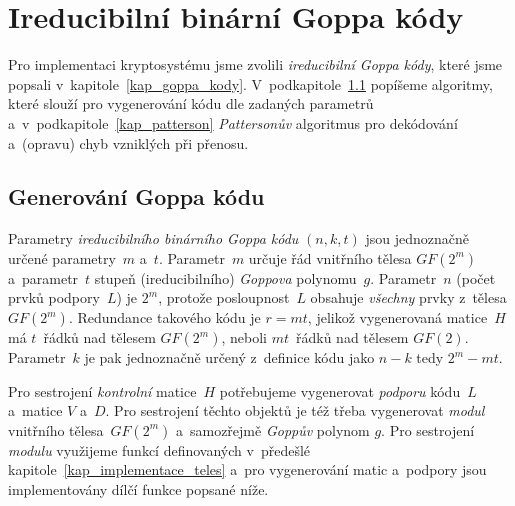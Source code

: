 \documentclass[thesis=M,czech,hidelinks]{FITthesis}[2012/06/26]
\newcommand{\0}{{\textcolor[gray]{0.75}{0}}}
\begin{document}
\clearpage

\section{Ireducibilní binární Goppa kódy}

Pro implementaci kryptosystému jsme zvolili \emph{ireducibilní Goppa kódy},
které jsme popsali v~kapitole~\ref{kap_goppa_kody}.
V~podkapitole~\ref{kap_generovani} popíšeme algoritmy, které slouží pro
vygenerování kódu dle zadaných parametrů a~v~podkapitole~\ref{kap_patterson}
\emph{Pattersonův} algoritmus pro dekódování a~(opravu) chyb vzniklých při
přenosu.


\subsection{Generování Goppa kódu}\label{kap_generovani}

Parametry \emph{ireducibilního binárního Goppa kódu} $(n,k,t)$ jsou jednoznačně
určené parametry~$m$ a~$t$. Parametr~$m$ určuje řád vnitřního tělesa $GF(2^m)$
a~parametr~$t$ stupeň (ireducibilního) \emph{Goppova} polynomu~$g$. Parametr~$n$
(počet prvků podpory~$L$) je $2^m$, protože posloupnost~$L$ obsahuje
\emph{všechny} prvky z~tělesa $GF(2^m)$. Redundance takového kódu je $r=mt$,
jelikož vygenerovaná matice~$H$ má $t$~řádků nad tělesem $GF(2^m)$, neboli
$mt$~řádků nad tělesem $GF(2)$. Parametr~$k$ je pak jednoznačně určený
z~definice kódu jako $n-k$ tedy $2^m-mt$.

Pro sestrojení \emph{kontrolní} matice~$H$ potřebujeme vygenerovat
\emph{podporu} kódu~$L$ a~matice $V$ a~$D$. Pro sestrojení těchto objektů je též
třeba vygenerovat \emph{modul} vnitřního tělesa~$GF(2^m)$ a~samozřejmě
\emph{Goppův} polynom $g$. Pro sestrojení \emph{modulu} využijeme funkcí
definovaných v~předešlé kapitole~\ref{kap_implementace_teles} a~pro vygenerování
matic a~podpory jsou implementovány dílčí funkce popsané níže.
\end{document}
